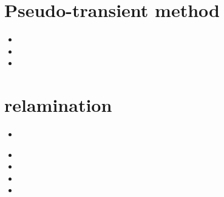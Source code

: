 \section{Pseudo-transient method}

\begin{small}
\begin{itemize}
\item[2019] 
\item[2022] 
\item[2024] 
\end{itemize}
\end{small}





\section{relamination}

\begin{small}
\begin{itemize}
\item[2013] 
 \\
\item[2021] 
\item[2022] 
\item[2025] 
\item[2026] 
\end{itemize}
\end{small}




